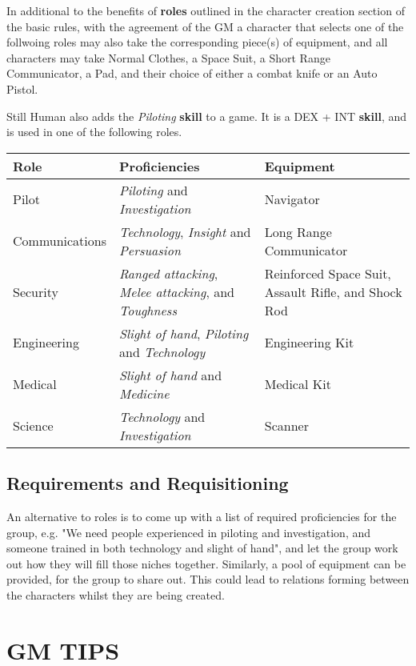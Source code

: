 \documentclass[11pt]{article}
\begin{document}
\begin{multicols}{3}
  In additional to the benefits of \textbf{roles} outlined in the character creation section of the basic rules, with the agreement of the GM a character that selects one of the follwoing roles may also take the corresponding piece(s) of equipment, and all characters may take Normal Clothes, a Space Suit, a Short Range Communicator, a Pad, and their choice of either a combat knife or an Auto Pistol.

  Still Human also adds the \textit{Piloting} \textbf{skill} to a game. It is a DEX + INT \textbf{skill}, and is used in one of the following roles.

  \begin{tabularx}{\linewidth}{lXX}
    Role & Proficiencies & Equipment \\
    \hline
    Pilot & \textit{Piloting} and \textit{Investigation} & Navigator \\
    Communications & \textit{Technology}, \textit{Insight} and \textit{Persuasion} & Long Range Communicator \\
    Security & \textit{Ranged attacking}, \textit{Melee attacking}, and \textit{Toughness} & Reinforced Space Suit, Assault Rifle, and Shock Rod \\
    Engineering & \textit{Slight of hand}, \textit{Piloting} and \textit{Technology} & Engineering Kit \\
    Medical & \textit{Slight of hand} and \textit{Medicine} & Medical Kit \\
    Science & \textit{Technology} and \textit{Investigation} & Scanner
  \end{tabularx}

  \subsection*{Requirements and Requisitioning}

  An alternative to roles is to come up with a list of required proficiencies for the group, e.g. "We need people experienced in piloting and investigation, and someone trained in both technology and slight of hand", and let the group work out how they will fill those niches together. Similarly, a pool of equipment can be provided, for the group to share out. This could lead to relations forming between the characters whilst they are being created.

  \section*{GM TIPS}


\end{multicols}
\end{document}
